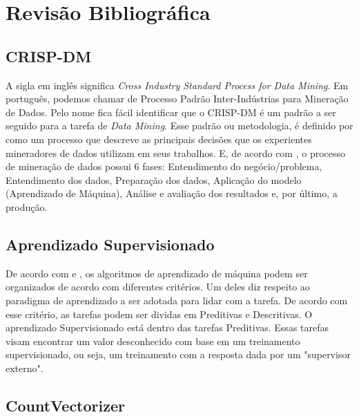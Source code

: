 \documentclass [12pt, a4paper] {article}
\begin{document}
\section{Revisão Bibliográfica}









\subsection{CRISP-DM}

A sigla em inglês significa \textit{Cross Industry Standard Process for Data Mining}. Em português, podemos chamar de Processo Padrão Inter-Indústrias para Mineração de Dados. Pelo nome fica fácil identificar que o CRISP-DM é um padrão a ser seguido para a tarefa de \textit{Data Mining}. Esse padrão ou metodologia, é definido por \cite{crisp2} como um processo que descreve as principais decisões que os experientes mineradores de dados utilizam em seus trabalhos. E, de acordo com \cite{crisp}, o processo de mineração de dados possui 6 fases: Entendimento do negócio/problema, Entendimento dos dados, Preparação dos dados, Aplicação do modelo (Aprendizado de Máquina),
Análise e avaliação dos resultados e, por último, a produção.






\subsection{Aprendizado Supervisionado}

De acordo com \cite{am} e \cite{mohri}, os algoritmos de aprendizado de máquina podem ser organizados de acordo com diferentes critérios. Um deles diz respeito ao paradigma de aprendizado a ser adotada para lidar com a tarefa. De acordo com esse critério, as tarefas podem ser dividas em Preditivas e Descritivas. O aprendizado Supervisionado está dentro das tarefas Preditivas. Essas tarefas visam encontrar um valor desconhecido com base em um treinamento supervisionado, ou seja, um treinamento com a resposta dada por um "supervisor externo".







\subsection{CountVectorizer}
\end{document}
